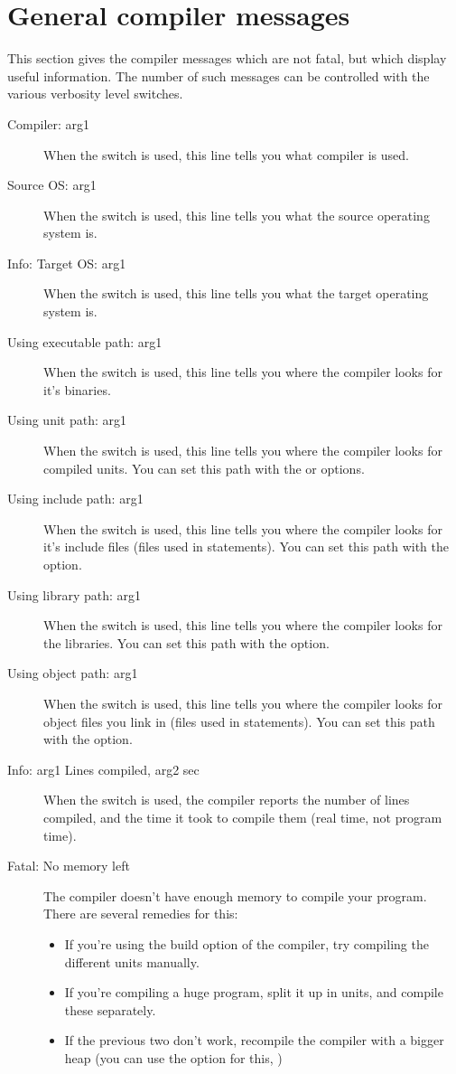 \section{General compiler messages}
 This section gives the compiler messages which are not fatal, but which
 display useful information. The number of such messages can be 
 controlled with the various verbosity level  switches.
 \begin{description}
\item [Compiler: arg1]
 When the  switch is used, this line tells you what compiler 
 is used.
\item [Source OS: arg1]
 When the  switch is used, this line tells you what the source 
 operating system is.
\item [Info: Target OS: arg1]
 When the  switch is used, this line tells you what the target
 operating system is.
\item [Using executable path: arg1]
 When the  switch is used, this line tells you where the compiler
 looks for it's binaries.
\item [Using unit path: arg1]
 When the  switch is used, this line tells you where the compiler
 looks for compiled units. You can set this path with the  or 
  options.
\item [Using include path: arg1]
 When the  switch is used, this line tells you where the compiler
 looks for it's include files (files used in  statements).
 You can set this path with the  option.
\item [Using library path: arg1]
 When the  switch is used, this line tells you where the compiler
 looks for the libraries. You can set this path with the  option.
\item [Using object path: arg1]
 When the  switch is used, this line tells you where the compiler
 looks for object files you link in (files used in  statements). 
 You can set this path with the  option.
\item [Info: arg1 Lines compiled, arg2 sec]
 When the  switch is used, the compiler reports the number
 of lines compiled, and the time it took to compile them (real time,
 not program time).
\item [Fatal: No memory left]
 The compiler doesn't have enough memory to compile your program. There are
 several remedies for this:
 \begin{itemize}
 \item If you're using the build option of the compiler, try compiling the
 different units manually.
 \item If you're compiling a huge program, split it up in units, and compile
 these separately.
 \item If the previous two don't work, recompile the compiler with a bigger
 heap (you can use the  option for this, )
 \end{itemize} 
 \end{description}
